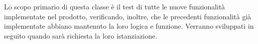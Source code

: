 Lo scopo primario di questa classe è il test di tutte le nuove funzionalità implementate nel prodotto, verificando, inoltre, che le precedenti funzionalità già implementate abbiano mantenuto la loro logica e funzione. Verranno sviluppati in seguito quando sarà richiesta la loro istanziazione.